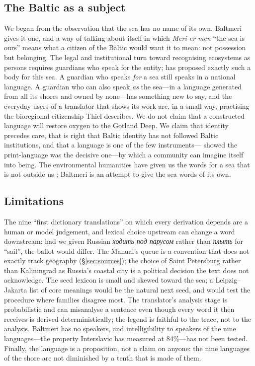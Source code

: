 \subsection{The Baltic as a subject}
We began from the observation that the sea has no name of its own. Baltmeri gives it one, and a way of talking about itself in which \emph{Meri er men} ``the sea is ours'' means what a citizen of the Baltic would want it to mean: not possession but belonging. The legal and institutional turn toward recognising ecosystems as persons \citep{stone1972,teawatupua2017,spain2022,kauffman2021} requires guardians who speak for the entity; \citet{thiel2024} has proposed exactly such a body for this sea. A guardian who speaks \emph{for} a sea still speaks in a national language. A guardian who can also speak \emph{as} the sea---in a language generated from all its shores and owned by none---has something new to say, and the everyday users of a translator that shows its work are, in a small way, practising the bioregional citizenship Thiel describes. We do not claim that a constructed language will restore oxygen to the Gotland Deep. We claim that identity precedes care, that \citet{gotz2016} is right that Baltic identity has not followed Baltic institutions, and that a language is one of the few instruments---\citet{anderson2006} showed the print-language was the decisive one---by which a community can imagine itself into being. The environmental humanities have given us the words for a sea that is not outside us \citep{neimanis2017,steinberg2015,haraway2016}; Baltmeri is an attempt to give the sea words of its own.

\subsection{Limitations}
The nine ``first dictionary translations'' on which every derivation depends are a human or model judgement, and lexical choice upstream can change a word downstream: had we given Russian \emph{ходить под парусом} rather than \emph{плыть} for ``sail'', the ballot would differ. The Manual's queue is a convention that does not exactly track geography (\S\ref{sec:sources}); the choice of Saint Petersburg rather than Kaliningrad as Russia's coastal city is a political decision the text does not acknowledge. The seed lexicon is small and skewed toward the sea; a Leipzig--Jakarta list of core meanings \citep{tadmor2010} would be the natural next seed, and would test the procedure where families disagree most. The translator's analysis stage is probabilistic and can misanalyse a sentence even though every word it then receives is derived deterministically; the legend is faithful to the trace, not to the analysis. Baltmeri has no speakers, and intelligibility to speakers of the nine languages---the property Interslavic has measured at 84\%---has not been tested. Finally, the language is a proposition, not a claim on anyone: the nine languages of the shore are not diminished by a tenth that is made of them.

